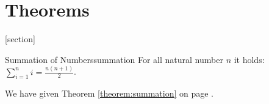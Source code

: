\documentclass{article}
\begin{document}
\section{Theorems}

[section]
\def\themytheorem{\thesection.\arabic{mytheorem}}


\begin{theo}{Summation of Numbers}{summation}
  For all natural number $n$ it holds:\\[2mm]
  $\displaystyle\sum\limits_{i=1}^n i = \frac{n(n+1)}{2}$.
\end{theo}

We have given Theorem \ref{theorem:summation} on page \pageref{theorem:summation}.
\end{document}
